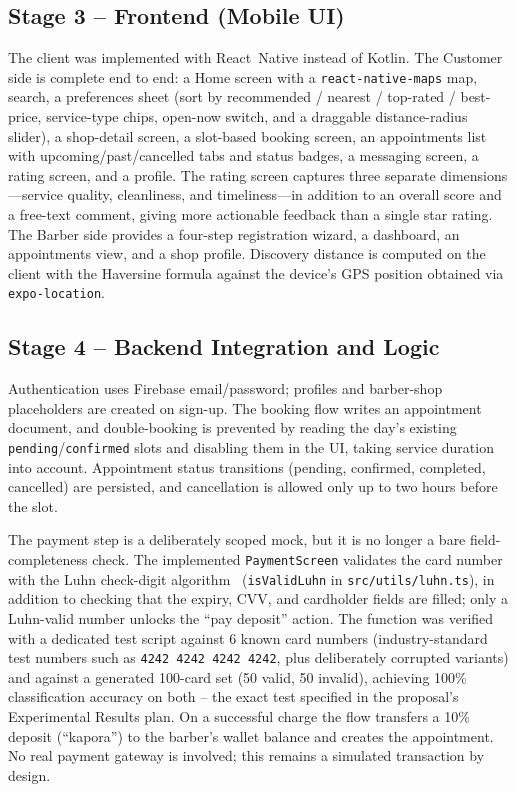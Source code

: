 \documentclass[14pt]{article}
\begin{document}
\subsection{Stage 3 -- Frontend (Mobile UI)}
The client was implemented with React~Native instead of Kotlin. The
Customer side is complete end to end: a Home screen with a
\texttt{react-native-maps} map, search, a preferences sheet (sort by
recommended / nearest / top-rated / best-price, service-type chips,
open-now switch, and a draggable distance-radius slider), a shop-detail
screen, a slot-based booking screen, an appointments list with
upcoming/past/cancelled tabs and status badges, a messaging screen, a
rating screen, and a profile. The rating screen captures three separate
dimensions---service quality, cleanliness, and timeliness---in addition
to an overall score and a free-text comment, giving more actionable
feedback than a single star rating. The Barber side provides a four-step
registration wizard, a dashboard, an appointments view, and a shop
profile. Discovery distance is computed on the client with the Haversine
formula against the device's GPS position obtained via
\texttt{expo-location}.

\subsection{Stage 4 -- Backend Integration and Logic}
Authentication uses Firebase email/password; profiles and barber-shop
placeholders are created on sign-up. The booking flow writes an
appointment document, and double-booking is prevented by reading the
day's existing \texttt{pending}/\texttt{confirmed} slots and disabling
them in the UI, taking service duration into account. Appointment status
transitions (pending, confirmed, completed, cancelled) are persisted, and
cancellation is allowed only up to two hours before the slot.

The payment step is a deliberately scoped mock, but it is no longer a
bare field-completeness check. The implemented \texttt{PaymentScreen}
validates the card number with the Luhn check-digit
algorithm~\citep{luhn1960verifying} (\texttt{isValidLuhn} in
\texttt{src/utils/luhn.ts}), in addition to checking that the expiry,
CVV, and cardholder fields are filled; only a Luhn-valid number unlocks
the ``pay deposit'' action. The function was verified with a dedicated
test script against 6 known card numbers (industry-standard test
numbers such as \texttt{4242\,4242\,4242\,4242}, plus deliberately
corrupted variants) and against a generated 100-card set (50 valid, 50
invalid), achieving 100\% classification accuracy on both -- the exact
test specified in the proposal's Experimental Results plan. On a
successful charge the flow transfers a 10\% deposit (``kapora'') to the
barber's wallet balance and creates the appointment. No real payment
gateway is involved; this remains a simulated transaction by design.
\end{document}
